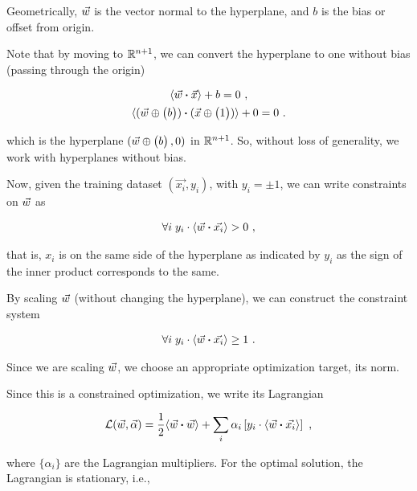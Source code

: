 Geometrically, \(\vec{w}\) is the vector normal to the hyperplane, and \(b\)
is the bias or offset from origin.

Note that by moving to \(\mathbb{R}^{n+1}\), we can convert the hyperplane to one
without bias (passing through the origin)

\begin{gather*}
    \innerprod{\vecw}{\vecx} + b = 0~,\\
    \innerprod{(\vecw \oplus \begin{pmatrix}
        b
    \end{pmatrix})} {(\vecx \oplus \begin{pmatrix}
        1
    \end{pmatrix})} + 0 = 0~.
\end{gather*}

which is the hyperplane \((\vec{w} \oplus \begin{pmatrix}b\end{pmatrix}, 0)\) in
\(\mathbb{R}^{n+1}\). So, without loss of generality, we work with hyperplanes
without bias.

Now, given the training dataset \({(\vec{x_i}, y_i)}\), with \(y_i = \pm 1\), we
can write constraints on \(\vec{w}\) as

\begin{gather}
    \forall i\; y_i \cdot \innerprod{\vecw}{\vec{x_i}} > 0~,
\end{gather}

that is, \(x_i\) is on the same side of the hyperplane as indicated by \(y_i\)
as the sign of the inner product corresponds to the same. 

By scaling \(\vec{w}\) (without changing the hyperplane), we can construct the
constraint system

\begin{gather}
    \forall i\; y_i \cdot \innerprod{\vecw}{\vec{x_i}} \geq 1~.
\end{gather}

Since we are scaling \(\vec{w}\), we choose an appropriate optimization target,
its norm.

Since this is a constrained optimization, we write its Lagrangian

\begin{gather}
    \mathcal{L}(\vecw, \vec{\alpha}) = \frac{1}{2} \innerprod{\vecw}{\vecw} + \sum_i \alpha_i \left[y_i \cdot \innerprod{\vecw}{\vec{x_i}}\right]~,
\end{gather}

where \(\{\alpha_i\}\) are the Lagrangian multipliers. For the optimal solution,
the Lagrangian is stationary, i.e.,

